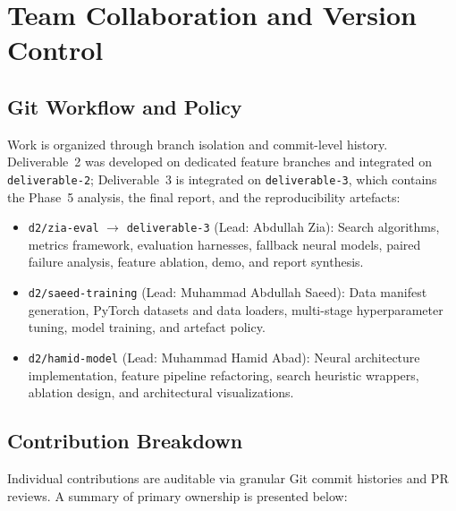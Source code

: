
\section{Team Collaboration and Version Control}

\subsection{Git Workflow and Policy}
Work is organized through branch isolation and commit-level history. Deliverable~2 was
developed on dedicated feature branches and integrated on \texttt{deliverable-2};
Deliverable~3 is integrated on \texttt{deliverable-3}, which contains the Phase~5
analysis, the final report, and the reproducibility artefacts:
\begin{itemize}
    \item \texttt{d2/zia-eval} $\rightarrow$ \texttt{deliverable-3} (Lead: Abdullah Zia): Search algorithms, metrics framework, evaluation harnesses, fallback neural models, paired failure analysis, feature ablation, demo, and report synthesis.
    \item \texttt{d2/saeed-training} (Lead: Muhammad Abdullah Saeed): Data manifest generation, PyTorch datasets and data loaders, multi-stage hyperparameter tuning, model training, and artefact policy.
    \item \texttt{d2/hamid-model} (Lead: Muhammad Hamid Abad): Neural architecture implementation, feature pipeline refactoring, search heuristic wrappers, ablation design, and architectural visualizations.
\end{itemize}

\subsection{Contribution Breakdown}
Individual contributions are auditable via granular Git commit histories and PR reviews.
A summary of primary ownership is presented below:


